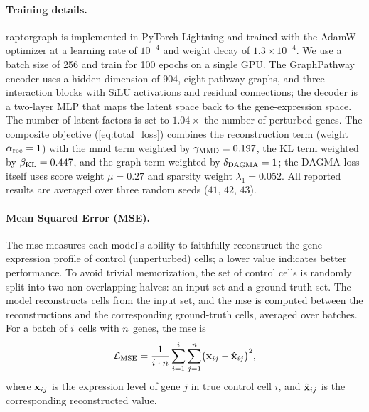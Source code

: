 \paragraph{Training details.}
\gls{raptorgraph} is implemented in PyTorch Lightning and trained with the AdamW optimizer at a learning rate of $10^{-4}$ and weight decay of $1.3\times10^{-4}$.
We use a batch size of 256 and train for 100 epochs on a single GPU.
The GraphPathway encoder uses a hidden dimension of 904, eight pathway graphs, and three interaction blocks with SiLU activations and residual connections; the decoder is a two-layer MLP that maps the latent space back to the gene-expression space.
The number of latent factors is set to $1.04\times$ the number of perturbed genes.
The composite objective (\cref{eq:total_loss}) combines the reconstruction term (weight $\alpha_{\text{rec}} = 1$) with the \gls{mmd} term weighted by $\gamma_{\text{MMD}} = 0.197$, the KL term weighted by $\beta_{\text{KL}} = 0.447$, and the graph term weighted by $\delta_{\text{DAGMA}} = 1$; the DAGMA loss itself uses score weight $\mu = 0.27$ and sparsity weight $\lambda_1 = 0.052$.
All reported results are averaged over three random seeds ($41$, $42$, $43$).

\paragraph{Mean Squared Error (MSE).}
The \gls{mse} measures each model's ability to faithfully reconstruct the gene expression profile of control (unperturbed) cells; a lower value indicates better performance.
To avoid trivial memorization, the set of control cells is randomly split into two non-overlapping halves: an input set and a ground-truth set.
The model reconstructs cells from the input set, and the \gls{mse} is computed between the reconstructions and the corresponding ground-truth cells, averaged over batches.
For a batch of $i$ cells with $n$ genes, the \gls{mse} is
\begin{equation}
    \mathcal{L}_{\text{MSE}} = \frac{1}{i \cdot n} \sum_{i=1}^{i} \sum_{j=1}^{n} \bigl( {\mathbf{x}}_{ij} - \hat{{\mathbf{x}}}_{ij} \bigr)^2,
    \label{eq:metrics:mse}
\end{equation}
where ${\mathbf{x}}_{ij}$ is the expression level of gene $j$ in true control cell $i$, and $\hat{{\mathbf{x}}}_{ij}$ is the corresponding reconstructed value.

